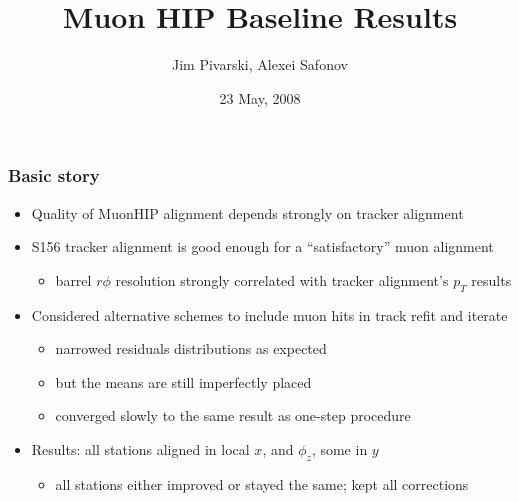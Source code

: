 \documentclass[compress]{beamer}
\title{Muon HIP Baseline Results}
\author{Jim Pivarski, Alexei Safonov}
\institute{Texas A\&M University}
\date{23 May, 2008}
\begin{document}
\frame{\titlepage}


\begin{frame}
\frametitle{Basic story}
\small

\begin{itemize}\setlength{\itemsep}{0.1 cm}
\item Quality of MuonHIP alignment depends strongly on tracker alignment
\item S156 tracker alignment is good enough for a ``satisfactory'' muon alignment
\begin{itemize}
\item barrel $r\phi$ resolution strongly correlated with tracker alignment's $p_T$ results
\end{itemize}
\item Considered alternative schemes to include muon hits in track refit and iterate
\begin{itemize}
\item narrowed residuals distributions as expected
\item but the means are still imperfectly placed
\item converged slowly to the same result as one-step procedure
\end{itemize}
\item Results: all stations aligned in local $x$, and $\phi_z$, some in $y$
\begin{itemize}
\item all stations either improved or stayed the same; kept all corrections
\end{itemize}

\end{itemize}
\end{frame}
\end{document}

